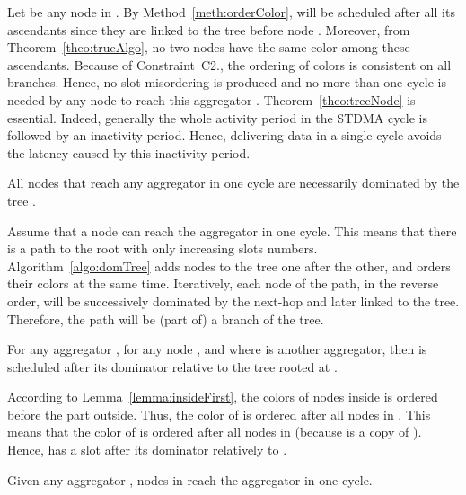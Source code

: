 \proof
Let  be any node in . By Method~\ref{meth:orderColor},   will be scheduled after all its ascendants since they are linked to the tree before node . Moreover, from Theorem~\ref{theo:trueAlgo}, no two nodes have the same color among these ascendants. 
Because of Constraint~C2., the ordering of colors is consistent on all branches. Hence, no slot misordering is produced and no more than one cycle is needed by any node  to reach this aggregator . 
\endproof
Theorem~\ref{theo:treeNode} is essential. Indeed, generally the whole activity period in the STDMA cycle is followed by an inactivity period. Hence, delivering data in a single cycle avoids the latency caused by this inactivity period.

\begin{lemma}
All nodes that reach any aggregator  in one cycle are necessarily dominated by the tree .
\end{lemma}

\proof
Assume that a node can reach the aggregator in one cycle. This means that there is a path to the root with only increasing slots numbers. Algorithm~\ref{algo:domTree} adds nodes to the tree one after the other, and orders their colors at the same time.
Iteratively, each node of the path, in the reverse order, will be successively dominated by the next-hop and later linked to the tree. Therefore, the path will be (part of) a branch of the tree. 
\endproof





\begin{lemma}\label{lemma:otherTree}
For any aggregator , for any node  , 
  and  where  is another aggregator, then  is scheduled after its dominator relative to the tree rooted at .
\end{lemma}

\proof
According to Lemma~\ref{lemma:insideFirst}, the colors of nodes inside  is ordered before the part outside. Thus, the color of  is ordered after all nodes in . This means that the color of  is ordered after all nodes in  (because  is a copy of ). Hence,  has a slot after its dominator relatively to .


\endproof

\begin{theorem}\label{theo:oneCycleTree}
Given any aggregator , nodes in  reach the aggregator  in one cycle.
\end{theorem}

